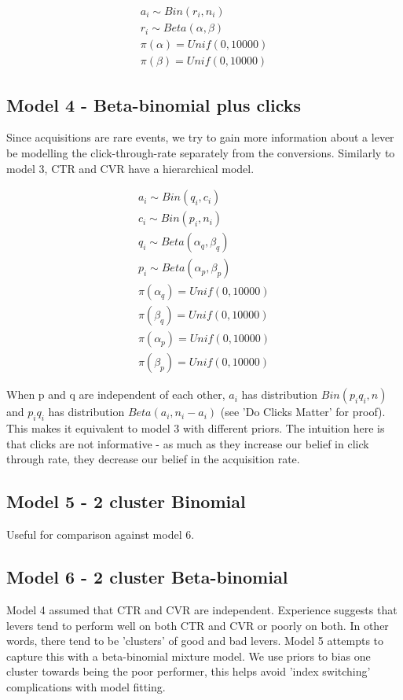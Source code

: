 \documentclass[11pt,a4,singlespacing,titlepagenumber=on]{scrreprt}
\numberwithin{equation}{chapter} %
\theoremstyle{remark}
\begin{document}
  \begin{align}
	a_i \sim Bin(r_i,n_i) \\
	r_i \sim Beta(\alpha,\beta) \\
	\pi(\alpha) = Unif(0,10000) \\
	\pi(\beta) = Unif(0,10000)
  \end{align}

\subsection{Model 4 - Beta-binomial plus clicks} 
Since acquisitions are rare events, we try to gain more information about a lever be modelling the click-through-rate separately from the conversions. Similarly to model 3, CTR and CVR have a hierarchical model.

  \begin{align}
	a_i \sim Bin(q_i,c_i) \\
	c_i \sim Bin(p_i,n_i) \\
	q_i \sim Beta(\alpha_q,\beta_q) \\
	p_i \sim Beta(\alpha_p,\beta_p) \\
	\pi(\alpha_q) = Unif(0,10000) \\
	\pi(\beta_q) = Unif(0,10000) \\
	\pi(\alpha_p) = Unif(0,10000) \\
	\pi(\beta_p) = Unif(0,10000) 
  \end{align}

When p and q are independent of each other, $a_i$ has distribution $Bin(p_iq_i,n)$ and $p_iq_i$ has distribution $Beta(a_i,n_i - a_i)$ (see 'Do Clicks Matter' for proof). This makes it equivalent to model 3 with different priors. The intuition here is that clicks are not informative - as much as they increase our belief in click through rate, they decrease our belief in the acquisition rate.

\subsection{Model 5 - 2 cluster Binomial} 

Useful for comparison against model 6.

\subsection{Model 6 - 2 cluster Beta-binomial }

Model 4 assumed that CTR and CVR are independent. Experience suggests that levers tend to perform well on both CTR and CVR or poorly on both. In other words, there tend to be 'clusters' of good and bad levers. Model 5 attempts to capture this with a beta-binomial mixture model. We use priors to bias one cluster towards being the poor performer, this helps avoid 'index switching' complications with model fitting. 
 
\end{document}
